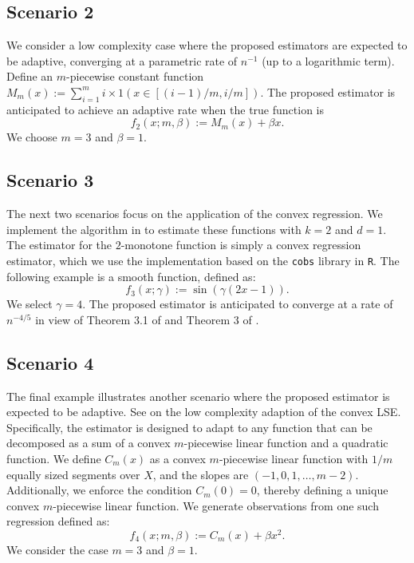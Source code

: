 \documentclass[12pt]{article}
\begin{document}
\begin{appendices}
\subsection*{Scenario 2}
We consider a low complexity case where the proposed estimators are expected to be adaptive, converging at a parametric rate of $n^{-1}$ (up to a logarithmic term). Define an $m$-piecewise constant function $M_m(x) := \sum_{i=1}^m i \times  1(x\in [(i-1)/m,i/m])$. The proposed estimator is anticipated to achieve an adaptive rate when the true function is
\begin{equation}
    f_2(x; m, \beta) := M_m(x) + \beta x.\label{eq:f2}
\end{equation}
We choose $m=3$ and $\beta=1$.

\subsection*{Scenario 3}
The next two scenarios focus on the application of the convex regression. We implement the algorithm in  to estimate these functions with $k=2$ and $d=1$. The estimator for the $2$-monotone function is simply a convex regression estimator, which we use the implementation based on the \texttt{cobs} library in \texttt{R}. The following example is a smooth function, defined as:
\[f_3(x; \gamma) := \sin(\gamma(2x-1)).\]
We select $\gamma = 4$. The proposed estimator is anticipated to converge at a rate of $n^{-4/5}$ in view of Theorem 3.1 of \cite{kuchibhotla2022least} and Theorem 3 of \cite{han2018robustness}. 
\subsection*{Scenario 4}
The final example illustrates another scenario where the proposed estimator is expected to be adaptive. See \cite{guntuboyina2015global, han2018robustness} on the low complexity adaption of the convex LSE. Specifically, the estimator is designed to adapt to any function that can be decomposed as a sum of a convex $m$-piecewise linear function and a quadratic function. We define $C_m(x)$ as a convex $m$-piecewise linear function with $1/m$ equally sized segments over $X$, and the slopes are $(-1, 0, 1, \dots, m-2)$. Additionally, we enforce the condition $C_m(0)=0$, thereby defining a unique convex $m$-piecewise linear function. We generate observations from one such regression defined as:
\[f_4(x; m, \beta) :=C_m(x) + \beta x^2.\]
We consider the case $m=3$ and $\beta=1$. 


\end{appendices}
\end{document}
